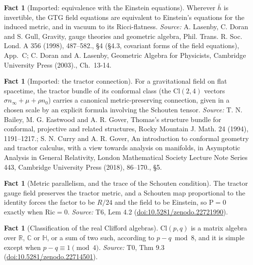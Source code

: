 \documentclass[11pt]{article}
\theoremstyle{definition}
\newtheorem{fact}[theorem]{Fact}
\theoremstyle{plain}
\providecommand{\C}{}\renewcommand{\C}{\mathbb{C}}
\providecommand{\Cl}{}\renewcommand{\Cl}{\mathrm{Cl}}
\providecommand{\HH}{}\renewcommand{\HH}{\mathbb{H}}
\providecommand{\R}{}\renewcommand{\R}{\mathbb{R}}
\providecommand{\Ric}{}\renewcommand{\Ric}{\mathrm{Ric}}
\providecommand{\Sch}{}\renewcommand{\Sch}{\mathrm{P}}
\providecommand{\hb}{}\renewcommand{\hb}{\bar{h}}
\providecommand{\nInf}{}\renewcommand{\nInf}{n_\infty}
\providecommand{\nO}{}\renewcommand{\nO}{n_0}
\begin{document}
\begin{fact}[Imported: equivalence with the Einstein equations]\label{c:interior.imported-equivalence-einstein-equations}
Wherever $\hb$ is invertible, the GTG field equations are equivalent to Einstein's equations for the induced metric, and in vacuum to its Ricci-flatness.
\emph{Source:} A. Lasenby, C. Doran and S. Gull, Gravity, gauge theories and geometric algebra, Phil. Trans. R. Soc. Lond. A 356 (1998), 487--582., \S 4 (\S 4.3, covariant forms of the field equations), App.~C; C. Doran and A. Lasenby, Geometric Algebra for Physicists, Cambridge University Press (2003)., Ch.~13-14.
\end{fact}

\begin{fact}[Imported: the tractor connection]\label{c:interior.imported-tractor-connection}
For a gravitational field on flat spacetime, the tractor bundle of its conformal class (the $\Cl(2,4)$ vectors $\sigma\nInf + \mu + \rho\nO$) carries a canonical metric-preserving connection, given in a chosen scale by an explicit formula involving the Schouten tensor.
\emph{Source:} T. N. Bailey, M. G. Eastwood and A. R. Gover, Thomas's structure bundle for conformal, projective and related structures, Rocky Mountain J. Math. 24 (1994), 1191--1217.; S. N. Curry and A. R. Gover, An introduction to conformal geometry and tractor calculus, with a view towards analysis on manifolds, in Asymptotic Analysis in General Relativity, London Mathematical Society Lecture Note Series 443, Cambridge University Press (2018), 86--170., \S 5.
\end{fact}

\begin{fact}[Metric parallelism, and the trace of the Schouten condition]\label{c:interior.metric-parallelism-trace-schouten-condition}
The tractor gauge field preserves the tractor metric, and a Schouten map proportional to the identity forces the factor to be $R/24$ and the field to be Einstein, so $\Sch = 0$ exactly when $\Ric = 0$.
\emph{Source:} T6, Lem 4.2 (\href{https://doi.org/10.5281/zenodo.22721990}{doi:10.5281/zenodo.22721990}).
\end{fact}

\begin{fact}[Classification of the real Clifford algebras]\label{c:primer.classification-real-clifford-algebras}
$\Cl(p,q)$ is a matrix algebra over $\R$, $\C$ or $\HH$, or a sum of two such, according to $p - q \bmod 8$, and it is simple except when $p - q \equiv 1 \pmod 4$.
\emph{Source:} T0, Thm 9.3 (\href{https://doi.org/10.5281/zenodo.22714501}{doi:10.5281/zenodo.22714501}).
\end{fact}
\end{document}
